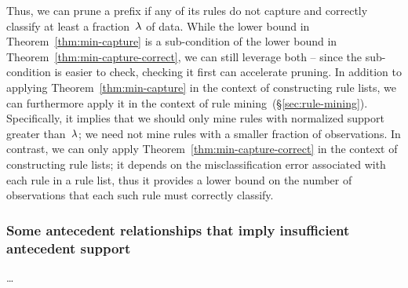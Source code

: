 Thus, we can prune a prefix if any of its rules do not capture
and correctly classify at least a fraction~${\lambda}$ of data.
%
While the lower bound in Theorem~\ref{thm:min-capture} is a sub-condition
of the lower bound in Theorem~\ref{thm:min-capture-correct},
we can still leverage both -- since the sub-condition is easier to check,
checking it first can accelerate pruning.
%
In addition to applying Theorem~\ref{thm:min-capture} in the context of
constructing rule lists, we can furthermore apply it in the context of
rule mining~(\S\ref{sec:rule-mining}).
%
Specifically, it implies that we should only mine rules with
normalized support greater than~${\lambda}$;
we need not mine rules with a smaller fraction of observations.
%
In contrast, we can only apply Theorem~\ref{thm:min-capture-correct}
in the context of constructing rule lists;
it depends on the misclassification error associated with each
rule in a rule list, thus it provides a lower bound on the number of
observations that each such rule must correctly classify.

\begin{arxiv}
\subsubsection{Some antecedent relationships that imply insufficient antecedent support}

\dots

\begin{comment}
Let us say that rule~$A$ dominates rule~$B$ if the data captured by~$B$ is a subset of the data captured by~$A$.
%
Rule~$B$ should never follow rule~$A$ in a rule list because it will never capture additional data;
this scenario is a special case where~\eqref{eq:min-capture} immediately applies.
%
More precisely, if~$\RL$ is a rule list that contains rule~$A$ and doesn't contain rule~$B$,
and~$\RL'$ is derived from~$\RL$ by inserting rule~$B$ anywhere after~$A$, then
\begin{align}
\Obj(\RL', \x, \y) = \Obj(\RL, \x, \y) + c \ge \Obj(\RL, \x, \y).
\end{align}
By considering rule semantics, it is easy to think of common situations
leading to dominance relationships between rules.
%
For example, if rule~$A$'s antecedent is~${(x_1 = 0)}$ and rule~$B$'s
antecedent is~${(x_1 = 0) \wedge (x_2 = 1)}$, then rule~$A$ dominates rule~$B$.
%
\end{comment}
\end{arxiv}


